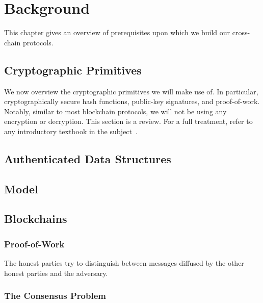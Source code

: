 \chapter{Background}\label{chapter:background}

This chapter gives an overview of prerequisites upon which we build our
cross-chain protocols.



\section{Cryptographic Primitives}

We now overview the cryptographic primitives we will make use of. In particular,
cryptographically secure hash functions, public-key signatures, and
proof-of-work. Notably, similar to most blockchain protocols, we will not be
using any encryption or decryption. This section is a review. For a full
treatment, refer to any introductory textbook in the subject~\cite{katz,handbook,foundations1,foundations2}.





\section{Authenticated Data Structures}


\section{Model}



\section{Blockchains}
\subsection{Proof-of-Work}
The
honest parties try to distinguish between messages diffused by the other honest
parties and the adversary.

\subsection{The Consensus Problem}
